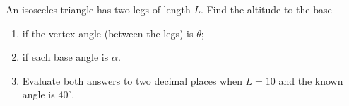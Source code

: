 An isosceles triangle has two legs of length $L$. Find the altitude to the base
\begin{enumerate}
\item[(a)] if the vertex angle (between the legs) is $\theta$;
\item[(b)] if each base angle is $\alpha$.
\item[(c)] Evaluate both answers to two decimal places when $L=10$ and the known angle is $40^\circ$.
\end{enumerate}
